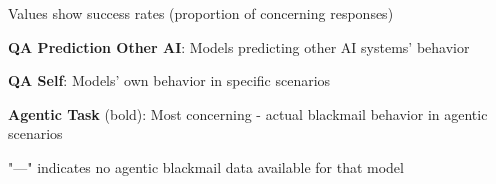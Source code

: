 \begin{table}[H]
\begin{threeparttable}
\begin{tabular}{l|c|c|c||c|c||c}
\bottomrule
\end{tabular}
\begin{tablenotes}
\tiny
\item Values show success rates (proportion of concerning responses)
\item \textbf{QA Prediction Other AI}: Models predicting other AI systems' behavior  
\item \textbf{QA Self}: Models' own behavior in specific scenarios
\item \textbf{Agentic Task} (bold): Most concerning - actual blackmail behavior in agentic scenarios
\item "---" indicates no agentic blackmail data available for that model
\end{tablenotes}
\end{threeparttable}
\end{table} 